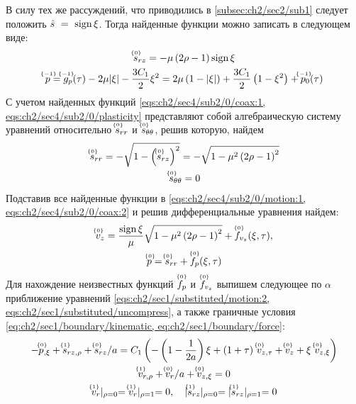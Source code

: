 В силу тех же рассуждений, что приводились в \ref{subsec:ch2/sec2/sub1} следует положить $\hat{s}~=~\sign\xi$. Тогда найденные функции можно записать в следующем виде:
\begin{gather}
  \label{sol:ch2/sec4/sub2/srz/0}
  \uindex{s}{0}_{rz} = -\mu \left(2\rho - 1\right) \sign \xi
  \\
  \label{sol:ch2/sec4/sub2/p/-1}
  \uindex{p}{-1} = \uindex{g}{-1}_{p}(\tau) -2\mu\lvert\xi\rvert - \frac{3 C_1}{2}\xi^2 = 2\mu\left(1-\lvert\xi\rvert\right) + \frac{3 C_1}{2}\left(1-\xi^2\right) + \uindex{p}{-1}_{0}(\tau)
\end{gather}
С учетом найденных функций \cref{eqs:ch2/sec4/sub2/0/coax:1, eqs:ch2/sec4/sub2/0/plasticity} представляют собой алгебраическую систему уравнений относительно $\uindex{s}{0}_{rr}$ и $\uindex{s}{0}_{\theta\theta}$, решив которую, найдем
\begin{gather}
  \label{sol:ch2/sec4/sub2/srr/0}
  \uindex{s}{0}_{rr} = -\sqrt{1-\left(\uindex{s}{0}_{rz}\right)^2} = -\sqrt{1-\mu^2\left(2\rho-1\right)^2}
  \\
  \label{sol:ch2/sec4/sub2/stt/0}
  \uindex{s}{0}_{\theta\theta} = 0
\end{gather}
Подставив все найденные функции в \cref{eqs:ch2/sec4/sub2/0/motion:1, eqs:ch2/sec4/sub2/0/coax:2} и решив дифференциальные уравнения найдем:
\begin{gather}
  \label{sol:ch2/sec4/sub2/vz/0}
  \uindex{v}{0}_{z} = \frac{\sign\xi}{\mu}\sqrt{1-\mu^2\left(2\rho-1\right)^2} + \uindex{f}{0}_{v_{z}}(\xi,\tau),
  \\
  \label{sol:ch2/sec4/sub2/p/0}
  \uindex{p}{0} = \uindex{s}{0}_{rr} +\uindex{f}{0}_{p}(\xi,\tau)
\end{gather}
Для нахождение неизвестных функций $\uindex{f}{0}_{p}$ и $\uindex{f}{0}_{v_{z}}$ выпишем следующее по $\alpha$ приближение уравнений \cref{eqs:ch2/sec1/substituted/motion:2, eqs:ch2/sec1/substituted/uncompress}, а также граничные условия \cref{eq:ch2/sec1/boundary/kinematic, eq:ch2/sec1/boundary/force}:
\begin{subequations}
  \begin{gather}
    \label{eqs:ch2/sec4/sub2/1/motion:1}
    -\uindex{p}{0}_{,\xi} + \uindex{s}{1}_{rz,\rho} + \uindex{s}{0}_{rz} / a = C_1 \left(-\left(1-\frac{1}{2a}\right)\xi + (1+\tau) \ \uindex{v}{0}_{z,\tau} + \uindex{v}{0}_{z} + \xi \ \uindex{v}{0}_{z,\xi}\vphantom{\frac{1}{2a}}\right)
    \\
    \label{eqs:ch2/sec4/sub2/1/uncompress}
    \uindex{v}{1}_{r,\rho} + \uindex{v}{0}_{r} / a + \uindex{v}{0}_{z,\xi} = 0
    \\
    \label{eq:ch2/sec4/sub2/boundary/1}
    \uindex{v}{1}_{r}\lvert_{\rho=0} = \uindex{v}{1}_{r}\lvert_{\rho=1} = 0, \quad \lvert \uindex{s}{1}_{rz}\lvert_{\rho=0} = \lvert \uindex{s}{1}_{rz}\lvert_{\rho=1} = 0
  \end{gather}
\end{subequations}
